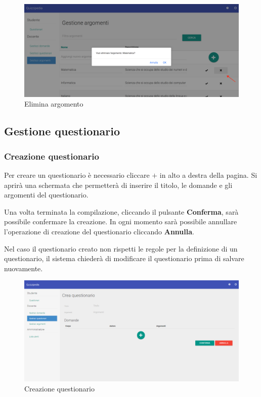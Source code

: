 \documentclass[12pt,a4paper]{article}
\begin{document}
			\begin{figure}[H]	
				\centering
				\includegraphics[width=1.0\linewidth]{../img/screenshot/eliminaArgomento.png}
				\caption{Elimina argomento}
				\label{Elimina argomento}
			\end{figure}
		
		\subsection{Gestione questionario}
		\subsubsection{Creazione questionario}
		\par Per creare un questionario è necessario cliccare $\boldsymbol{+}$ in alto a destra della pagina. Si aprirà una schermata che permetterà di inserire il titolo, le domande e gli argomenti del questionario. \\
		\par Una volta terminata la compilazione, cliccando il pulsante \textbf{Conferma}, sarà possibile confermare la creazione. 
		In ogni momento sarà possibile annullare l'operazione di creazione del questionario cliccando \textbf{Annulla}.
		
		\par Nel caso il questionario creato non rispetti le regole per la definizione di un questionario, il sistema chiederà di modificare il questionario prima di salvare nuovamente. \\
		
		\begin{figure}[H]	
			\centering
			\includegraphics[width=1.0\linewidth]{../img/screenshot/creazioneQuestionario.png}
			\caption{Creazione questionario}
			\label{Creazione questionario}
		\end{figure}
		
\end{document}

